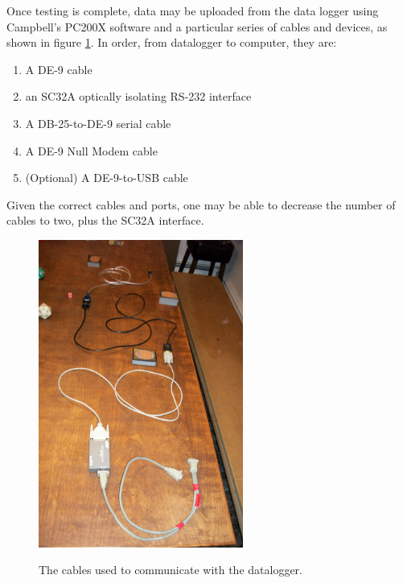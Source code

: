 
Once testing is complete, data may be uploaded from the data logger using
Campbell's PC200X software and a particular series of cables and devices, as
shown in figure \ref{fig:cable}. In order, from datalogger to computer, they
are:


\begin{enumerate}
\item A DE-9 cable
\item an SC32A optically isolating RS-232 interface
\item A DB-25-to-DE-9 serial cable
\item A DE-9 Null Modem cable
\item (Optional) A DE-9-to-USB cable
\end{enumerate}

Given the correct cables and ports, one may be able to decrease the number of
cables to two, plus the SC32A interface.

\begin{figure}[h]
\centering
\includegraphics[width=0.6\textwidth]{fig/cable.jpg}
\label{fig:cable}
\caption{The cables used to communicate with the datalogger.}
\end{figure}





